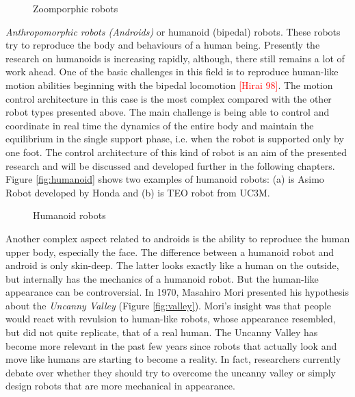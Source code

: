 \begin{figure}[!hbt]
\centering 
{}\hspace{10mm}
\caption{Zoomporphic robots}
\label{fig:zoo}
\end{figure}

\textit{Anthropomorphic robots (Androids)} or humanoid (bipedal) robots. These robots try to reproduce the body and behaviours of a human being. Presently the research on humanoids is increasing rapidly, although, there still remains a lot of work ahead. One of the basic challenges in this field is to reproduce human-like motion abilities beginning with the bipedal locomotion \textcolor{red}{[Hirai 98]}. The motion control architecture in this case is the most complex compared with the other robot types presented above. The main challenge is being able to control and coordinate in real time the dynamics of the entire body and maintain the equilibrium in the single support phase, i.e. when the robot is supported only by one foot. The control architecture of this kind of robot is an aim of the presented research and will be discussed and developed further in the following chapters. Figure \ref{fig:humanoid} shows two examples of humanoid robots: (a) is Asimo Robot developed by Honda and (b) is TEO robot from UC3M.

\begin{figure}[!hbt]
\centering 
{}\hspace{10mm}
\caption{Humanoid robots}
\label{fig:zoo}
\end{figure}


Another complex aspect related to androids is the ability to reproduce the human upper body, especially the face. The difference between a humanoid robot and android is only skin-deep. The latter looks exactly like a human on the outside, but internally has the mechanics of a humanoid robot. But the human-like appearance can be controversial. In 1970, Masahiro Mori presented his hypothesis about the \textit{Uncanny Valley} (Figure \ref{fig:valley}). Mori's insight was that people would react with revulsion to human-like robots, whose appearance resembled, but did not quite replicate, that of a real human. The Uncanny Valley has become more relevant in the past few years since robots that actually look and move like humans are starting to become a reality. In fact, researchers currently debate over whether they should try to overcome the uncanny valley or simply design robots that are more mechanical in appearance.

